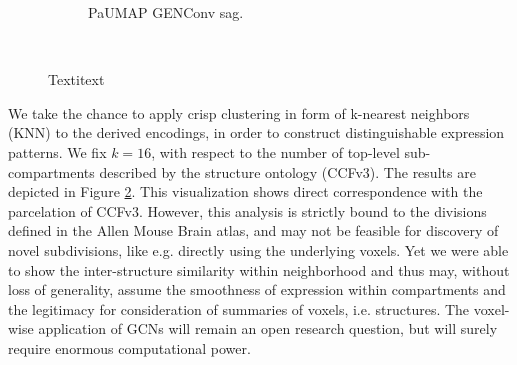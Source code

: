 \documentclass[]{article}
\begin{document}
\begin{figure}
\begin{subfigure}{.28\textwidth}
		\caption{PaUMAP GENConv sag.}
		\label{fig:disc_clustering_sag}
	\end{subfigure}\\
	
	\caption{Textitext}
	\label{fig:disc_clustering}
\end{figure}


We take the chance to apply crisp clustering in form of k-nearest neighbors (KNN) to the derived encodings, in order to construct distinguishable expression patterns. We fix $k=16$, with respect to the number of top-level sub-compartments described by the structure ontology (CCFv3). The results are depicted in Figure \ref{fig:disc_clustering}. This visualization shows direct correspondence with the parcelation of CCFv3. However, this analysis is strictly bound to the divisions defined in the Allen Mouse Brain atlas, and may not be feasible for discovery of novel subdivisions, like e.g. \citet{takata_flexible_2021} directly using the underlying voxels. Yet we were able to show the inter-structure similarity within neighborhood and thus may, without loss of generality, assume the smoothness of expression within compartments and the legitimacy for consideration of summaries of voxels, i.e. structures. The voxel-wise application of GCNs will remain an open research question, but will surely require enormous computational power.\\



%
%
%	
\end{document}
